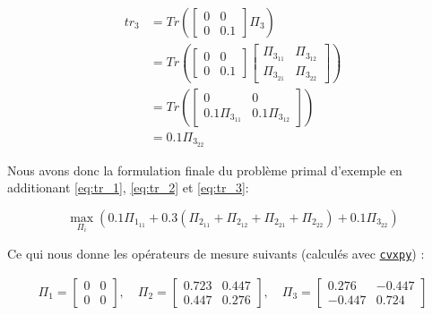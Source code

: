 \documentclass[12pt,a4paper]{article}
\begin{document}
    \begin{minipage}{.5\linewidth}
        \begin{align}
            tr_3 & = Tr( \begin{bmatrix} 0 & 0 \\ 0 & 0.1 \end{bmatrix} \Pi_3 ) \nonumber \\
            & = Tr( \begin{bmatrix} 0 & 0 \\ 0 & 0.1 \end{bmatrix} \begin{bmatrix} \Pi_{3_{11}} & \Pi_{3_{12}} \\ \Pi_{3_{21}} & \Pi_{3_{22}} \end{bmatrix} ) \nonumber \\
            & = Tr( \begin{bmatrix} 0 & 0 \\ 0.1\Pi_{3_{11}} & 0.1 \Pi_{3_{12}}  \end{bmatrix}) \nonumber \\
            & = 0.1\Pi_{3_{22}} \label{eq:tr_3}
        \end{align}
    \end{minipage}

    Nous avons donc la formulation finale du problème primal d'exemple en additionant \ref{eq:tr_1}, \ref{eq:tr_2} et \ref{eq:tr_3}:

    \begin{equation}
        \max\limits_{\Pi_i} (0.1\Pi_{1_{11}} + 0.3(\Pi_{2_{11}} + \Pi_{2_{12}} + \Pi_{2_{21}} + \Pi_{2_{22}}) + 0.1\Pi_{3_{22}} )
    \end{equation}

    Ce qui nous donne les opérateurs de mesure suivants (calculés avec \href{https://www.cvxpy.org/}{\texttt{cvxpy}}) :

    \begin{align}
        \Pi_1 = \begin{bmatrix} 0 & 0 \\ 0 & 0 \end{bmatrix} , \quad \Pi_2 = \begin{bmatrix} 0.723 & 0.447 \\ 0.447 & 0.276 \end{bmatrix} , \quad \Pi_3 = \begin{bmatrix} 0.276 & -0.447 \\ -0.447 & 0.724 \end{bmatrix} \nonumber
    \end{align}
\end{document}
